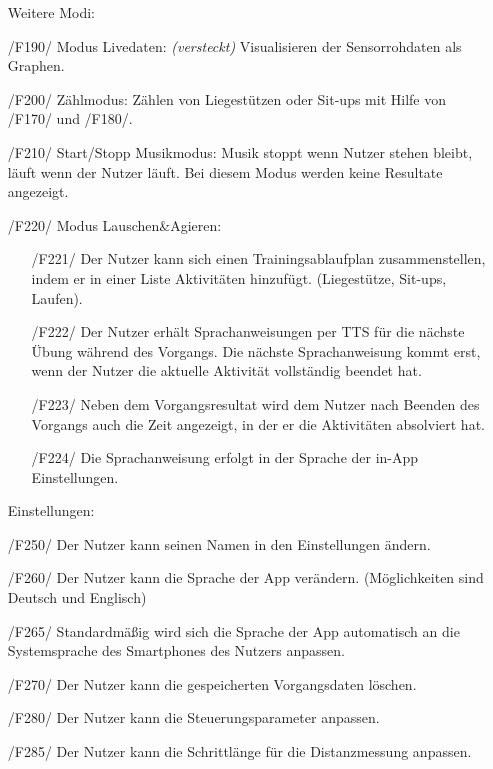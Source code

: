 \documentclass[a4paper,12pt]{article}
\begin{document}
    \begin{itemize}

      \item[] \textsf{Weitere Modi:}
        \item[/F190/] \textsf{Modus Livedaten: \textit{(versteckt)}} Visualisieren der Sensorrohdaten als Graphen.%
        \item[/F200/] \textsf{Zählmodus:} Zählen von Liegestützen oder Sit-ups mit Hilfe von /F170/ und /F180/.
        \item[/F210/] \textsf{Start/Stopp Musikmodus:} Musik stoppt wenn Nutzer stehen bleibt, läuft wenn der Nutzer läuft. Bei diesem Modus werden keine Resultate angezeigt.
      
 	    \item[/F220/] \textsf{Modus \glqq Lauschen\&Agieren\grqq:}
 	    \begin{itemize}
        \item[/F221/]Der Nutzer kann sich einen Trainingsablaufplan zusammenstellen, indem er in einer Liste Aktivitäten hinzufügt. (Liegestütze, Sit-ups, Laufen). 
        \item[/F222/] Der Nutzer erhält Sprachanweisungen per TTS für die nächste Übung während des Vorgangs. Die nächste Sprachanweisung kommt erst, wenn der Nutzer die aktuelle Aktivität vollständig beendet hat.
        \item[/F223/] Neben dem Vorgangsresultat wird dem Nutzer nach Beenden des Vorgangs auch die Zeit angezeigt, in der er die Aktivitäten absolviert hat.
        \item[/F224/] Die Sprachanweisung erfolgt in der Sprache der in-App Einstellungen.
       \end{itemize}
    
      \item[] \textsf{Einstellungen:}
        \item[/F250/] Der Nutzer kann seinen Namen in den Einstellungen ändern.
        \item[/F260/] Der Nutzer kann die Sprache der App verändern. (Möglichkeiten sind Deutsch und Englisch)
        \item[/F265/] Standardmäßig wird sich die Sprache der App automatisch an die Systemsprache des Smartphones des Nutzers anpassen.
        \item[/F270/] Der Nutzer kann die gespeicherten \Gls{Vorgangsdaten} löschen.
        \item[/F280/] Der Nutzer kann die \Gls{Steuerungsparameter} anpassen. 
        \item[/F285/] Der Nutzer kann die Schrittlänge für die Distanzmessung anpassen.
  

\end{itemize}
\end{document}

